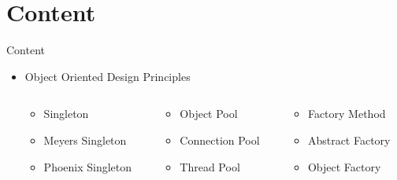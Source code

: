 \documentclass{beamer}
\begin{document}

\begin{frame}
\maketitle{}
\end{frame}


\section{Content}
\begin{frame}{Content}
\begin{itemize}
  \item \Large{Object Oriented Design Principles}
    \vspace{0.25cm}
\begin{columns}
  \hfill
  \begin{column}{.3\textwidth}
    \begin{block}{}
      \begin{itemize}
        \item Singleton
        \item Meyers Singleton
        \item Phoenix Singleton
      \end{itemize}
    \end{block}
  \end{column}
  \begin{column}{.3\textwidth}
    \begin{block}{}
      \begin{itemize}
        \item Object Pool
        \item Connection Pool
        \item Thread Pool
      \end{itemize}
    \end{block}
  \end{column}
  \begin{column}{.3\textwidth}
    \begin{block}{}
      \begin{itemize}
        \item Factory Method
        \item Abstract Factory
        \item Object Factory
      \end{itemize}
    \end{block}
  \end{column}
\end{columns}
\end{itemize}
\end{frame}
\end{document}
